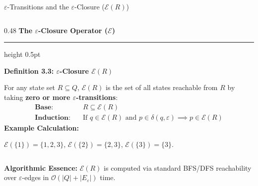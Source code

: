 \documentclass[aspectratio=169, 10pt]{beamer}
\newcommand{\colheader}[1]{%
  {\noindent\footnotesize\bfseries\color{gimpanavy}#1}%
  \vspace{0.02cm}%
  {\color{gimpanavy!30}\hrule height 0.5pt}%
  \vspace{0.05cm}%
}
\newcommand{\greentitle}[1]{{\noindent\footnotesize\bfseries\color{accentGreen}#1}\par\vspace{0.03cm}}
\begin{document}
\begin{frame}{$\varepsilon$-Transitions and the $\varepsilon$-Closure ($\mathcal{E}(R)$)}
\begin{columns}[T]
    \begin{column}{0.48\textwidth}
      \colheader{The $\varepsilon$-Closure Operator ($\mathcal{E}$)}
      \begin{tcolorbox}[examplecard]
        \greentitle{Definition 3.3: $\varepsilon$-Closure $\mathcal{E}(R)$}
        {\scriptsize
        For any state set $R \subseteq Q$, $\mathcal{E}(R)$ is the set of all states reachable from $R$ by taking \textbf{zero or more $\varepsilon$-transitions}:
        \begin{align*}
          \textbf{Base:} \quad &R \subseteq \mathcal{E}(R) \\
          \textbf{Induction:} \quad &\text{If } q \in \mathcal{E}(R) \text{ and } p \in \delta(q, \varepsilon) \implies p \in \mathcal{E}(R)
        \end{align*}
        }
        \vspace{0.01cm}
        \greentitle{Example Calculation:}
        \begin{center}
        \end{center}
        {\scriptsize $\mathcal{E}(\{1\}) = \{1, 2, 3\}$, \quad $\mathcal{E}(\{2\}) = \{2, 3\}$, \quad $\mathcal{E}(\{3\}) = \{3\}$.}
      \end{tcolorbox}
    \end{column}
  \end{columns}
  
  \vspace{0.01cm}
  \begin{tcolorbox}[spotlightcard]
    {\scriptsize\textbf{Algorithmic Essence:} $\mathcal{E}(R)$ is computed via standard BFS/DFS reachability over $\varepsilon$-edges in $\mathcal{O}(|Q| + |E_\varepsilon|)$ time.}
  \end{tcolorbox}
\end{frame}
\end{document}
